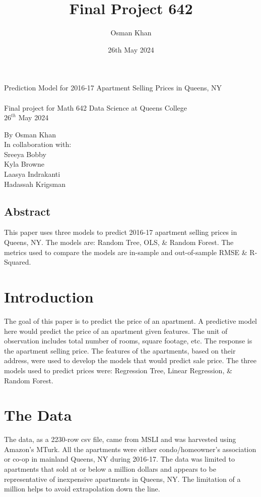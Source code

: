 \documentclass{article}
\title{Final Project 642}
\author{Osman Khan}
\date{26th May 2024}
\begin{document}
\begin{center}
\LARGE{Prediction Model for 2016-17 Apartment Selling Prices in Queens, NY}\\~\\
\footnotesize Final project for Math 642 Data Science at Queens College\\
$26^{th}$ May 2024

\end{center}
\begin{flushright}
    By Osman Khan\\
    In collaboration with:\\
    Sreeya Bobby\\
    Kyla Browne\\
    Laasya Indrakanti\\
    Hadassah Krigsman\\
\end{flushright}
\subsection*{Abstract}
This paper uses three models to predict 2016-17 apartment selling prices in Queens, NY. The models are: Random Tree, OLS, \& Random Forest. The metrics used to compare the models are in-sample and out-of-sample RMSE \& R-Squared. 
\newpage
\section{Introduction}
The goal of this paper is to predict the price of an apartment. A predictive model here would predict the price of an apartment given features. The unit of observation includes total number of rooms, square footage, etc. The response is the apartment selling price. The features of the apartments, based on their address, were used to develop the models that would predict sale price. The three models used to predict prices were: Regression Tree, Linear Regression, \& Random Forest. 
\section{The Data}
The data, as a 2230-row csv file, came from MSLI and was harvested using Amazon's MTurk. All the apartments were either condo/homeowner's association or co-op in mainland Queens, NY during 2016-17. The data was limited to apartments that sold at or below a million dollars and appears to be representative of inexpensive apartments in Queens, NY. The limitation of a million helps to avoid extrapolation down the line. 
\end{document}
